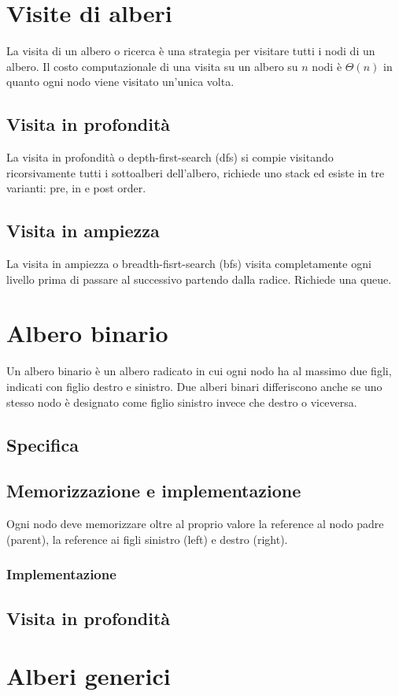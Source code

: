 \section{Visite di alberi}
La visita di un albero o ricerca \`e una strategia per visitare tutti i nodi di un albero. Il costo computazionale di una visita su un albero su $n$ nodi
\`e $\Theta(n)$ in quanto ogni nodo viene visitato un'unica volta.
\subsection{Visita in profondit\`a}
La visita in profondit\`a o depth-first-search (dfs) si compie visitando ricorsivamente tutti i sottoalberi dell'albero, richiede uno stack ed esiste in tre 
varianti: pre, in e post order.
\subsection{Visita in ampiezza}
La visita in ampiezza o breadth-fisrt-search (bfs) visita completamente ogni livello prima di passare al successivo partendo dalla radice. Richiede una 
queue.
\section{Albero binario}
Un albero binario \`e un albero radicato in cui ogni nodo ha al massimo due figli, indicati con figlio destro e sinistro. Due alberi binari differiscono 
anche se uno stesso nodo \`e designato come figlio sinistro invece che destro o viceversa.
\subsection{Specifica}

\subsection{Memorizzazione e implementazione}
Ogni nodo deve memorizzare oltre al proprio valore la reference al nodo padre (parent), la reference ai figli sinistro (left) e destro (right).
\subsubsection{Implementazione}

\subsection{Visita in profondit\`a}

\section{Alberi generici}

